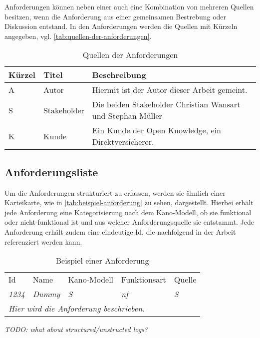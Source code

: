 Anforderungen können neben einer auch eine Kombination von mehreren Quellen besitzen, wenn die Anforderung aus einer gemeinsamen Bestrebung oder Diskussion entstand. In den Anforderungen werden die Quellen mit Kürzeln angegeben, vgl. \autoref{tab:quellen-der-anforderungen}.

\begin{table}[H]
\begin{tabular}{ |p{1.15cm}|p{1.9cm}|p{10.45cm}| }
	\hline
	Kürzel & Titel & Beschreibung \\
	\hline
	A & Autor & Hiermit ist der Autor dieser Arbeit gemeint. \\
	\hline
	S & Stakeholder & Die beiden Stakeholder Christian Wansart und Stephan Müller \\
	\hline
	K & Kunde & Ein Kunde der Open Knowledge, ein Direktversicherer. \\
	\hline
\end{tabular}
 \captionsetup{justification=centering}
  \caption{Quellen der Anforderungen}
   \label{tab:quellen-der-anforderungen}
\end{table}
	
\subsection{Anforderungsliste}

Um die Anforderungen strukturiert zu erfassen, werden sie ähnlich einer Karteikarte, wie in \autoref{tab:beispiel-anforderung} zu sehen, dargestellt. Hierbei erhält jede Anforderung eine Kategorisierung nach dem Kano-Modell, ob sie funktional oder nicht-funktional ist und aus welcher Anforderungsquelle sie entstammt. Jede Anforderung erhält zudem eine eindeutige Id, die nachfolgend in der Arbeit referenziert werden kann.

\begin{table}[H]
\begin{tabular}{ |p{1.25cm}|p{5.5cm}|p{2.25cm}|p{2.1cm}|p{1.25cm}| }
\hline
Id            & Name          & Kano-Modell   & Funktionsart  & Quelle        \\
\textit{1234} & \textit{Dummy} & \textit{S} & \textit{nf} & \textit{S} \\
\hline
\multicolumn{5}{|l|}{\textit{Hier wird die Anforderung beschrieben.}} \\
\hline
\end{tabular}
 \captionsetup{justification=centering}
  \caption{Beispiel einer Anforderung}
   \label{tab:beispiel-anforderung}
\end{table}




\textit{\color{red}TODO: what about structured/unstructed logs?}
